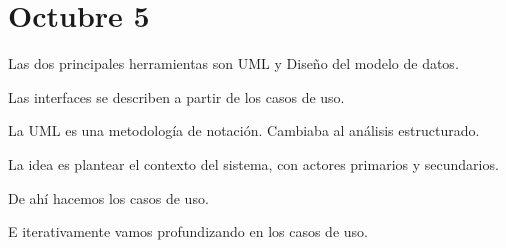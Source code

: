 \section{Octubre 5}

Las dos principales herramientas son UML y Diseño del modelo de datos.

Las interfaces se describen a partir de los casos de uso.

La UML es una metodología de notación. 
Cambiaba al análisis estructurado.

La idea es plantear el contexto del sistema,
con actores primarios y secundarios.

De ahí hacemos los casos de uso.

E iterativamente vamos profundizando en los casos de uso.